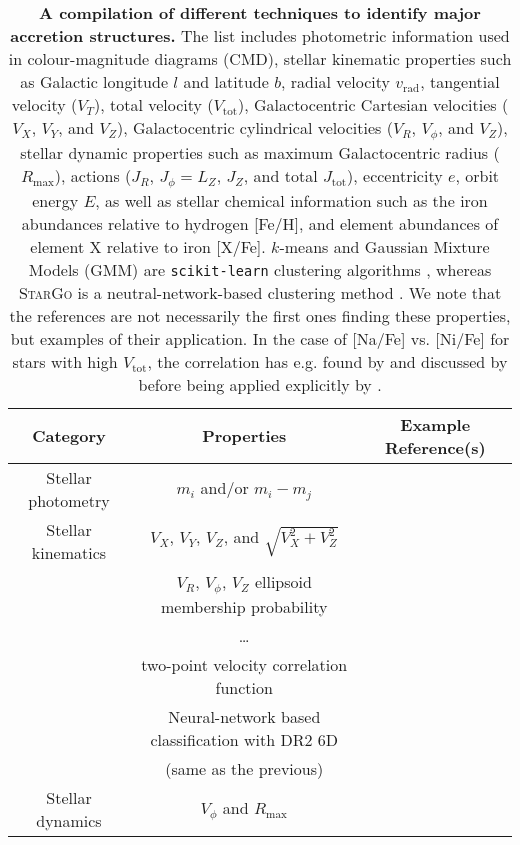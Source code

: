 \begin{table*}    \centering
    \caption{
    \textbf{A compilation of different techniques to identify major accretion structures.}
    The list includes photometric information used in colour-magnitude diagrams (CMD), stellar kinematic properties such as Galactic longitude $l$ and latitude $b$, radial velocity $v_\text{rad}$, tangential velocity ($V_T$), total velocity ($V_\text{tot}$), Galactocentric Cartesian velocities ($V_X$, $V_Y$, and $V_Z$), Galactocentric cylindrical velocities ($V_R$, $V_\phi$, and $V_Z$), stellar dynamic properties such as maximum Galactocentric radius ($R_\text{max}$), actions ($J_R$, $J_\phi = L_Z$, $J_Z$, and total $J_\text{tot}$), eccentricity $e$, orbit energy $E$, as well as stellar chemical information such as the iron abundances relative to hydrogen [Fe/H], and element abundances of element X relative to iron [X/Fe]. $k$-means and Gaussian Mixture Models (GMM) are \texttt{scikit-learn} clustering algorithms \citep{scikit-learn}, whereas \textsc{StarGo} is a neutral-network-based clustering method \citet{Yuan2018}.
    We note that the references are not necessarily the first ones finding these properties, but examples of their application. In the case of [Na/Fe] vs. [Ni/Fe] for stars with high $V_\text{tot}$, the correlation has e.g. found by \citet{Nissen1997,Nissen2010} and discussed by \citet{Venn2004} before being applied explicitly by \citet{Bensby2014}.
    }
    \begin{tabular}{c|c|c}
        \hline \hline
        Category & Properties & Example Reference(s) \\
        \hline
        Stellar photometry & $m_i$ and/or $m_i - m_j$ & \citet{Belokurov2006} \\
        \hline
        Stellar kinematics & $V_X$, $V_Y$, $V_Z$, and $\sqrt{V_X^2+V_Z^2}$ & \citet{Koppelman2018} \\
		& $V_R$, $V_\phi$, $V_Z$ ellipsoid membership probability & \citet{Carollo2010} \\
		& \dots & \citet{Ishigaki2012, Ishigaki2013} \\
		& two-point velocity correlation function & \citet{ReFiorentin2015} \\
		& Neural-network based classification with \Gaia DR2 6D & \citet{Ostdiek2020} \\
		& (same as the previous) & \citet{Necib2020} \\
        \hline
        Stellar dynamics & $V_\phi$ and $R_\text{max}$ & \citet{Gratton2003} \\

\end{tabular}
\end{table*}
